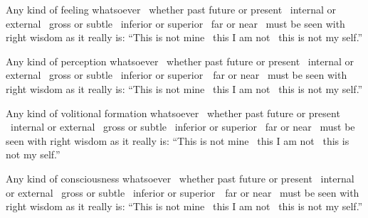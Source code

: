 \begin{english-only-hang}
  Any kind of feeling whatsoever \breathmark\ whether past future or present \breathmark\ internal or external \breathmark\ gross or subtle \breathmark\ inferior or superior \breathmark\ far or near \breathmark\ must be seen with right wisdom as it really is: ``This is not mine \breathmark\ this I am not \breathmark\ this is not my self.''
\end{english-only-hang}

\begin{english-only-hang}
  Any kind of perception whatsoever \breathmark\ whether past future or present \breathmark\ internal or external \breathmark\ gross or subtle \breathmark\ inferior or \mbox{superior}~\breathmark\ far or near \breathmark\ must be seen with right wisdom as it really is: ``This is not mine \breathmark\ this I am not \breathmark\ this is not my self.''
\end{english-only-hang}

\begin{english-only-hang}
  Any kind of volitional formation whatsoever \breathmark\ whether past future or present \breathmark\ internal or external \breathmark\ gross or subtle \breathmark\ inferior or superior \breathmark\ far or near \breathmark\ must be seen with right wisdom as it really is: ``This is not mine \breathmark\ this I am not \breathmark\ this is not my self.''
\end{english-only-hang}

\begin{english-only-hang}
  Any kind of consciousness whatsoever \breathmark\ whether past future or present \breathmark\ internal or external \breathmark\ gross or subtle \breathmark\ inferior or \mbox{superior}~\breathmark\ far or near \breathmark\ must be seen with right wisdom as it really is: ``This is not mine \breathmark\ this I am not \breathmark\ this is not my self.''
\end{english-only-hang}

